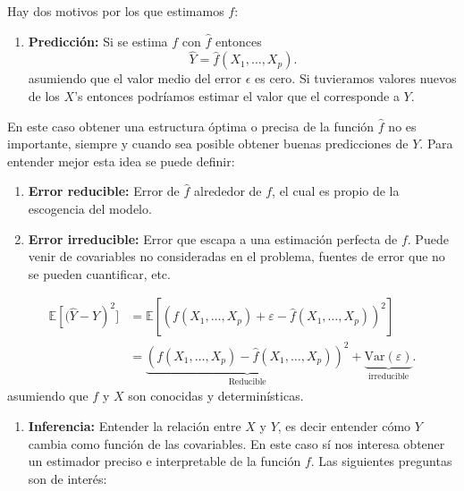 \documentclass[
  12pt,
]{book}
\providecommand{\tightlist}{%
  \setlength{\itemsep}{0pt}\setlength{\parskip}{0pt}}
\theoremstyle{definition}
\theoremstyle{definition}
\theoremstyle{definition}
\theoremstyle{definition}
\theoremstyle{remark}
\begin{document}
Hay dos motivos por los que estimamos \(f\):

\begin{enumerate}
\def\labelenumi{\arabic{enumi}.}
\tightlist
\item
  \textbf{Predicción:} Si se estima \(f\) con \(\hat{f}\) entonces
  \begin{equation*}
  \hat{Y} = \hat{f}(X_{1},\ldots,X_{p}). 
  \end{equation*}
  asumiendo que el valor medio del error \(\epsilon\) es cero. Si tuvieramos valores nuevos de los \(X\)'s entonces podríamos estimar el valor que el corresponde a \(Y\).
\end{enumerate}

En este caso obtener una estructura óptima o precisa de la función \(\hat f\) no es importante, siempre y cuando sea posible obtener buenas predicciones de \(Y\). Para entender mejor esta idea se puede definir:

\begin{enumerate}
\def\labelenumi{\alph{enumi}.}
\tightlist
\item
  \textbf{Error reducible:} Error de \(\hat{f}\) alrededor de \(f\), el cual es propio de la escogencia del modelo.
\item
  \textbf{Error irreducible:} Error que escapa a una estimación perfecta de \(f\). Puede venir de covariables no consideradas en el problema, fuentes de error que no se pueden cuantificar, etc.
\end{enumerate}

\begin{align*}
\mathbb{E}\left[(\hat{Y}-Y\right)^2] 
&=  \mathbb{E}\left[\left(  f(X_{1},\ldots,X_{p}) + \varepsilon - \hat{f}(X_{1},\ldots,X_{p}) \right)^{2}  \right] \\
&= \underbrace{\left( f(X_{1},\ldots,X_{p})- \hat{f}(X_{1},\ldots,X_{p})  \right) ^{2} }_{\text{Reducible}}
+\underbrace{\mathrm{Var}\left(\varepsilon\right)}_{\text{irreducible}}.
\end{align*}
asumiendo que \(f\) y \(X\) son conocidas y determinísticas.

\begin{enumerate}
\def\labelenumi{\arabic{enumi}.}
\setcounter{enumi}{1}
\tightlist
\item
  \textbf{Inferencia:} Entender la relación entre \(X\) y \(Y\), es decir entender cómo \(Y\) cambia como función de las covariables.
  En este caso sí nos interesa obtener un estimador preciso e interpretable de la función \(f\). Las siguientes preguntas son de interés:
\end{enumerate}
\end{document}

